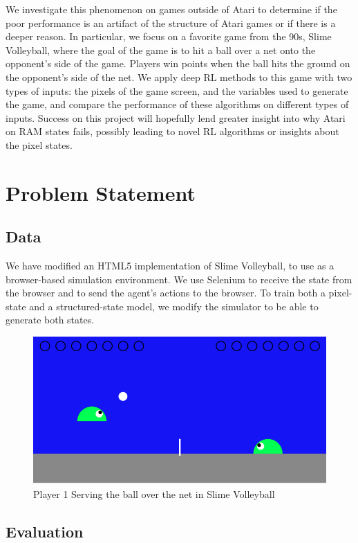 \documentclass[10pt,twocolumn,letterpaper]{article}
\begin{document}
We investigate this phenomenon on games outside of Atari to determine
if the poor performance is an artifact of the structure of Atari games or if
there is a deeper reason. In particular, we focus on a favorite game from the
90s, Slime Volleyball, where the goal of the game is to hit a ball over a net
onto the opponent's side of the game. Players win points when the ball hits the
ground on the opponent's side of the net. We apply deep RL methods to
this game with two types of inputs: the pixels of the game screen, and the
variables used to generate the game, and compare the performance of these
algorithms on different types of inputs. Success on this project will hopefully
lend greater insight into why Atari on RAM states fails, possibly leading to
novel RL algorithms or insights about the pixel states.

\section{Problem Statement}
\subsection{Data}

We have modified an HTML5 implementation of Slime Volleyball, to use
as a browser-based simulation environment. We use Selenium to receive the
state from the browser and to send the agent's actions to the browser. To train
both a pixel-state and a structured-state model, we modify the simulator to be
able to generate both states.


\begin{figure}[h]
\center
\includegraphics[width=\columnwidth]{SlimeVolleyBall}
\caption{
Player 1 Serving the ball over the net in Slime Volleyball
}\label{fig:slime}
\end{figure}

\subsection{Evaluation}
\end{document}
